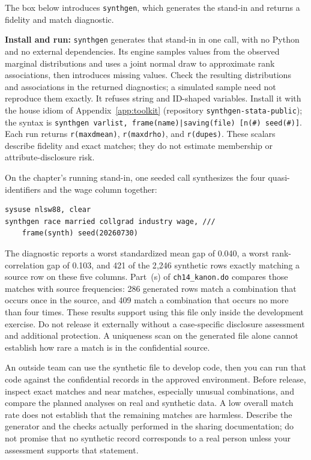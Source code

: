 \documentclass[
    a4paper,
    fontsize=10pt,
    twoside=true,
    numbers=noenddot,
]{kaobook}
\begin{document}
The box below introduces \texttt{synthgen}, which generates the stand-in and returns a fidelity and match diagnostic.

\begin{kaobox}[frametitle=Package Integration: \texttt{synthgen}]
\textbf{Install and run:} \texttt{synthgen} generates that stand-in in one call, with no Python and no external dependencies. Its engine samples values from the observed marginal distributions and uses a joint normal draw to approximate rank associations, then introduces missing values. Check the resulting distributions and associations in the returned diagnostics; a simulated sample need not reproduce them exactly. It refuses string and ID-shaped variables. Install it with the house idiom of Appendix~\ref{app:toolkit} (repository \texttt{synthgen-stata-public}); the syntax is \texttt{synthgen varlist, frame(name)|saving(file) [n(\#) seed(\#)]}. Each run returns \texttt{r(maxdmean)}, \texttt{r(maxdrho)}, and \texttt{r(dupes)}. These scalars describe fidelity and exact matches; they do not estimate membership or attribute-disclosure risk.
\end{kaobox}

On the chapter's running stand-in, one seeded call synthesizes the four quasi-identifiers and the wage column together:
\par
{\footnotesize
\begin{verbatim}
sysuse nlsw88, clear
synthgen race married collgrad industry wage, ///
    frame(synth) seed(20260730)
\end{verbatim}
}
The diagnostic reports a worst standardized mean gap of 0.040, a worst rank-correlation gap of 0.103, and 421 of the 2{,}246 synthetic rows exactly matching a source row on these five columns. Part~(s) of \texttt{ch14\_kanon.do} compares those matches with source frequencies: 286 generated rows match a combination that occurs once in the source, and 409 match a combination that occurs no more than four times. These results support using this file only inside the development exercise. Do not release it externally without a case-specific disclosure assessment and additional protection. A uniqueness scan on the generated file alone cannot establish how rare a match is in the confidential source.

An outside team can use the synthetic file to develop code, then you can run that code against the confidential records in the approved environment. Before release, inspect exact matches and near matches, especially unusual combinations, and compare the planned analyses on real and synthetic data. A low overall match rate does not establish that the remaining matches are harmless. Describe the generator and the checks actually performed in the sharing documentation; do not promise that no synthetic record corresponds to a real person unless your assessment supports that statement.
\end{document}
